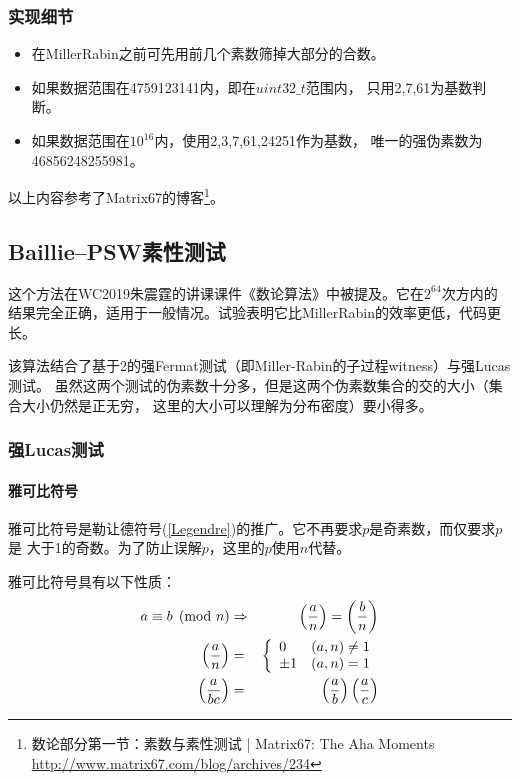 \subsubsection{实现细节}
\begin{itemize}
    \item 在MillerRabin之前可先用前几个素数筛掉大部分的合数。
    \item 如果数据范围在4759123141内，即在$uint32\_t$范围内，
    只用2,7,61为基数判断。
    \item 如果数据范围在$10^{16}$内，使用2,3,7,61,24251作为基数，
    唯一的强伪素数为46856248255981。
\end{itemize}

以上内容参考了Matrix67的博客\footnote{
	数论部分第一节：素数与素性测试 | Matrix67: The Aha Moments
	\url{http://www.matrix67.com/blog/archives/234}}。
\subsection{Baillie–PSW素性测试}
这个方法在WC2019朱震霆的讲课课件《数论算法》中被提及。它在$2^{64}$次方内的
结果完全正确，适用于一般情况。试验表明它比MillerRabin的效率更低，代码更长。

该算法结合了基于2的强Fermat测试（即Miller-Rabin的子过程witness）与强Lucas测试。
虽然这两个测试的伪素数十分多，但是这两个伪素数集合的交的大小（集合大小仍然是正无穷，
这里的大小可以理解为分布密度）要小得多。

\subsubsection{强Lucas测试}
\paragraph{雅可比符号}
雅可比符号是勒让德符号(\ref{Legendre})的推广。它不再要求$p$是奇素数，而仅要求$p$是
大于1的奇数。为了防止误解$p$，这里的$p$使用$n$代替。

雅可比符号具有以下性质：
\begin{eqnarray}
    a\equiv b\pmod{n}&\Rightarrow& \left(\frac{a}{n}\right)=\left(\frac{b}{n}\right)\label{JSR1}\\
    \left(\frac{a}{n}\right)&=&\left\{
    \begin{array}{lr}
        0&(a,n)\neq 1\\
        \pm 1&(a,n)=1
    \end{array}
    \right.\label{JSR2}\\
    \left(\frac{a}{bc}\right)&=&\left(\frac{a}{b}\right)\left(\frac{a}{c}\right)\label{JSR3}\\
\end{eqnarray}


